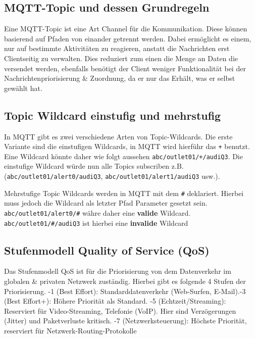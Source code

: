 \documentclass[9pt,a4paper]{report}
\begin{document}
	\subsection{MQTT-Topic und dessen Grundregeln}
	Eine MQTT-Topic ist eine Art Channel für die Kommunikation. Diese können basierend auf Pfaden von einander getrennt werden. Dabei ermöglicht es einem, nur auf bestimmte Aktivitäten zu reagieren, anstatt die Nachrichten erst Clientseitig zu verwalten. Dies reduziert zum einen die Menge an Daten die versendet werden, ebenfalls benötigt der Client weniger Funktionalität bei der Nachrichtenpriorisierung \& Zuordnung, da er nur das Erhält, was er selbst gewählt hat.
	
	\subsection{Topic Wildcard einstufig und mehrstufig}
	In MQTT gibt es zwei verschiedene Arten von Topic-Wildcards.
	Die erste Variante sind die einstufigen Wildcards, in MQTT wird hierführ das \texttt{+} benutzt. Eine Wildcard könnte daher wie folgt aussehen \newline \texttt{abc/outlet01/+/audiQ3}. Die einstufige Wildcard würde nun alle Topics subscriben z.B. \newline (\texttt{abc/outlet01/alert0/audiQ3}, \texttt{abc/outlet01/alert1/audiQ3} usw.).
	
	Mehrstufige Topic Wildcards werden in MQTT mit dem \texttt{\#} deklariert. Hierbei muss jedoch die Wildcard als letzter Pfad Parameter gesetzt sein. \texttt{abc/outlet01/alert0/\#} währe daher eine \textbf{valide} Wildcard. \texttt{abc/outlet01/\#/audiQ3} ist hierbei eine \textbf{invalide} Wildcard
	
	\subsection{Stufenmodell Quality of Service (QoS)}
	Das Stufenmodell QoS ist für die Priorisierung von dem Datenverkehr im globalen \& privaten Netzwerk zuständig. Hierbei gibt es folgende 4 Stufen der Priorisierung.
	\newline
	-1 (Best Effort): Standarddatenverkehr (Web-Surfen, E-Mail).-3 (Best Effort+): Höhere Priorität als Standard. -5 (Echtzeit/Streaming): Reserviert für Video-Streaming, Telefonie (VoIP). Hier sind Verzögerungen (Jitter) und Paketverluste kritisch. -7 (Netzwerksteuerung): Höchste Priorität, reserviert für Netzwerk-Routing-Protokolle
	
\end{document}
